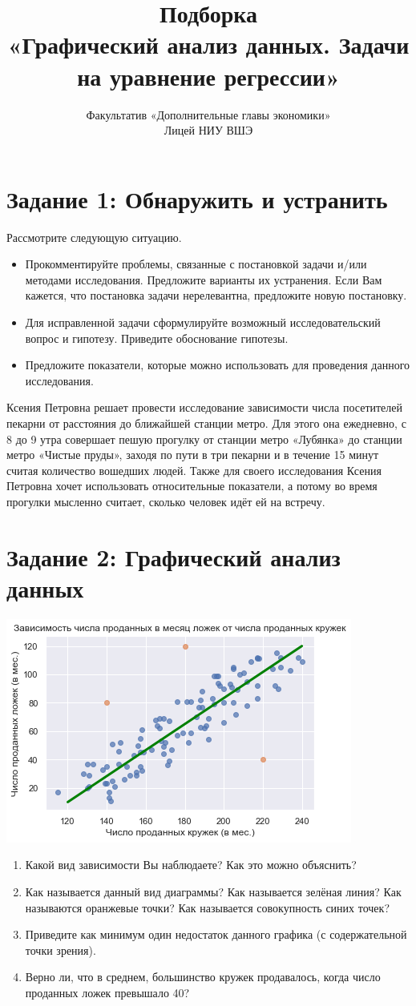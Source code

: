 \documentclass[10pt, a4paper]{extarticle}
\title{Подборка \\ «Графический анализ данных. Задачи на уравнение регрессии»}
\author{Факультатив «Дополнительные главы экономики» \\ Лицей НИУ ВШЭ}
\begin{document}
\maketitle

\section*{Задание 1: Обнаружить и устранить}
Рассмотрите следующую ситуацию.
\begin{itemize}
	\item Прокомментируйте проблемы, связанные с постановкой задачи и/или методами исследования. Предложите варианты их устранения. Если Вам кажется, что постановка задачи нерелевантна, предложите новую постановку. 
	\item Для исправленной задачи сформулируйте возможный исследовательский вопрос и гипотезу. Приведите обоснование гипотезы. 
	\item Предложите показатели, которые можно использовать для проведения данного исследования.
\end{itemize}

Ксения Петровна решает провести исследование зависимости числа посетителей пекарни от расстояния до ближайшей станции метро. Для этого она ежедневно, с 8 до 9 утра совершает пешую прогулку от станции метро «Лубянка» до станции метро «Чистые пруды», заходя по пути в три пекарни и в течение 15 минут считая количество вошедших людей. Также для своего исследования Ксения Петровна хочет использовать относительные показатели, а потому во время прогулки мысленно считает, сколько человек идёт ей на встречу. 

\section*{Задание 2: Графический анализ данных}
\begin{center}
	\includegraphics[width=0.54\linewidth]{gr.png}
\end{center}
\begin{enumerate}
	\item Какой вид зависимости Вы наблюдаете? Как это можно объяснить?
	\item Как называется данный вид диаграммы? Как называется зелёная линия? Как называются оранжевые точки? Как называется совокупность синих точек? 
	\item Приведите как минимум один недостаток данного графика (с содержательной точки зрения). 
	\item Верно ли, что в среднем, большинство кружек продавалось, когда число проданных ложек превышало 40? 
\end{enumerate}
\end{document}
